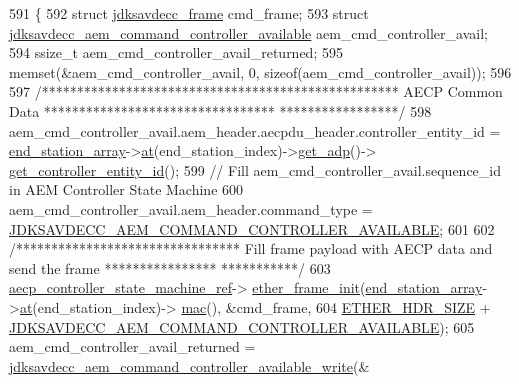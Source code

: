 \begin{DoxyCode}
591 \{
592     \textcolor{keyword}{struct }\hyperlink{structjdksavdecc__frame}{jdksavdecc\_frame} cmd\_frame;
593     \textcolor{keyword}{struct }\hyperlink{structjdksavdecc__aem__command__controller__available}{jdksavdecc\_aem\_command\_controller\_available} 
      aem\_cmd\_controller\_avail;
594     ssize\_t aem\_cmd\_controller\_avail\_returned;
595     memset(&aem\_cmd\_controller\_avail, 0, \textcolor{keyword}{sizeof}(aem\_cmd\_controller\_avail));
596 
597     \textcolor{comment}{/*************************************************** AECP Common Data *********************************
      *****************/}
598     aem\_cmd\_controller\_avail.aem\_header.aecpdu\_header.controller\_entity\_id = 
      \hyperlink{classavdecc__lib_1_1controller__imp_a17c6518dbb728acdcd1c4e78d7bc1c5a}{end\_station\_array}->\hyperlink{classavdecc__lib_1_1end__stations_a8b2053474417f106d063017c5b60bad2}{at}(end\_station\_index)->\hyperlink{classavdecc__lib_1_1end__station__imp_a471a74540ce6182fad0c17dfd010107e}{get\_adp}()->
      \hyperlink{classavdecc__lib_1_1adp_a0c0959a46658c0a22e9530334b2912da}{get\_controller\_entity\_id}();
599     \textcolor{comment}{// Fill aem\_cmd\_controller\_avail.sequence\_id in AEM Controller State Machine}
600     aem\_cmd\_controller\_avail.aem\_header.command\_type = 
      \hyperlink{group__command_ga742fafae5e26884f3caac94dcc6c2814}{JDKSAVDECC\_AEM\_COMMAND\_CONTROLLER\_AVAILABLE};
601 
602     \textcolor{comment}{/******************************** Fill frame payload with AECP data and send the frame ****************
      ***********/}
603     \hyperlink{namespaceavdecc__lib_a0b1b5aea3c0490f77cbfd9178af5be22}{aecp\_controller\_state\_machine\_ref}->
      \hyperlink{classavdecc__lib_1_1aecp__controller__state__machine_a86ff947c5e6b799cfb877d3767bfa1f9}{ether\_frame\_init}(\hyperlink{classavdecc__lib_1_1controller__imp_a17c6518dbb728acdcd1c4e78d7bc1c5a}{end\_station\_array}->\hyperlink{classavdecc__lib_1_1end__stations_a8b2053474417f106d063017c5b60bad2}{at}(end\_station\_index)->
      \hyperlink{classavdecc__lib_1_1end__station__imp_a08e1bd1861b3b8f447ea374a65ac11f9}{mac}(), &cmd\_frame,
604                                                         \hyperlink{namespaceavdecc__lib_a6c827b1a0d973e18119c5e3da518e65ca9512ad9b34302ba7048d88197e0a2dc0}{ETHER\_HDR\_SIZE} + 
      \hyperlink{group__command_ga742fafae5e26884f3caac94dcc6c2814}{JDKSAVDECC\_AEM\_COMMAND\_CONTROLLER\_AVAILABLE});
605     aem\_cmd\_controller\_avail\_returned = 
      \hyperlink{group__command__controller__available_gaf3a7e226608cfad9ec1503099a658c55}{jdksavdecc\_aem\_command\_controller\_available\_write}(&

\end{DoxyCode}
